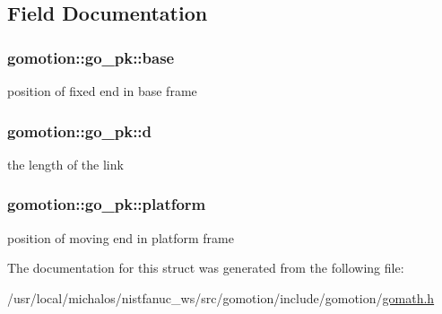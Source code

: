\subsection{Field Documentation}
\hypertarget{structgomotion_1_1go__pk_aaf6f59205aa710b5c9f04a49d13c6ac6}{
\subsubsection[{base}]{ gomotion\-::go\-\_\-pk\-::base}}\label{structgomotion_1_1go__pk_aaf6f59205aa710b5c9f04a49d13c6ac6}
position of fixed end in base frame \hypertarget{structgomotion_1_1go__pk_aca6d69ffde00a2f9b3f61af53c5e3377}{
\subsubsection[{d}]{ gomotion\-::go\-\_\-pk\-::d}}\label{structgomotion_1_1go__pk_aca6d69ffde00a2f9b3f61af53c5e3377}
the length of the link \hypertarget{structgomotion_1_1go__pk_ab3407e97c5c78c53e361609b52b78962}{
\subsubsection[{platform}]{ gomotion\-::go\-\_\-pk\-::platform}}\label{structgomotion_1_1go__pk_ab3407e97c5c78c53e361609b52b78962}
position of moving end in platform frame 

The documentation for this struct was generated from the following file\-:\begin{DoxyCompactItemize}
\item 
/usr/local/michalos/nistfanuc\-\_\-ws/src/gomotion/include/gomotion/\hyperlink{gomath_8h}{gomath.\-h}\end{DoxyCompactItemize}
